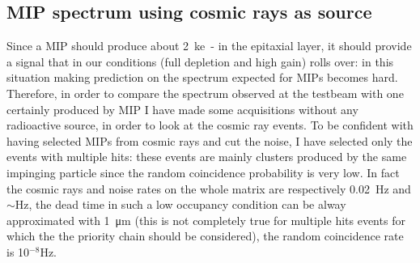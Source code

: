    \subsection{MIP spectrum using cosmic rays as source}
      Since a MIP should produce about \SI{2}{ke-} in the epitaxial layer, it should provide a signal that in our conditions (full depletion and high gain) rolls over: in this situation making prediction on the spectrum expected for MIPs becomes hard. 
      Therefore, in order to compare the spectrum observed at the testbeam with one certainly produced by MIP I have made some acquisitions without any radioactive source, in order to look at the cosmic ray events. 
      To be confident with having selected MIPs from cosmic rays and cut the noise, I have selected only the events with multiple hits: these events are mainly clusters produced by the same impinging particle since the random coincidence probability is very low. 
      In fact the cosmic rays and noise rates on the whole matrix are respectively \SI{0.02}{Hz} and $\sim$\si{Hz}, the dead time in such a low occupancy condition can be alway approximated with \SI{1}{\um} (this is not completely true for multiple hits events for which the the priority chain should be considered), the random coincidence rate is 10$^{-8}$\si{Hz}.
